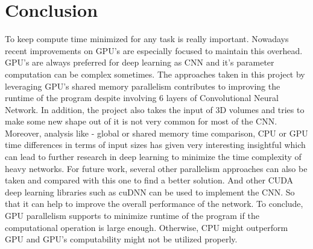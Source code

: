 \documentclass[11pt]{article}       %
\begin{document}
\section{Conclusion} \label{concl}
To keep compute time minimized for any task is really important. Nowadays recent improvements on GPU's are especially focused to maintain this overhead. GPU's are always preferred for deep learning as CNN and it's parameter computation can be complex sometimes. The approaches taken in this project by leveraging GPU's shared memory parallelism contributes to improving the runtime of the program despite involving 6 layers of Convolutional Neural Network. In addition, the project also takes the input of 3D volumes and tries to make some new shape out of it is not very common for most of the CNN. Moreover,  analysis like - global or shared memory time comparison, CPU or GPU time differences in terms of input sizes has given very interesting insightful which can lead to further research in deep learning to minimize the time complexity of heavy networks.\newline
For future work, several other parallelism approaches can also be taken and compared with this one to find a better solution. And other CUDA deep learning libraries such as cuDNN can be used to implement the CNN. So that it can help to improve the overall performance of the network. To conclude, GPU parallelism supports to minimize runtime of the program if the computational operation is large enough. Otherwise, CPU might outperform GPU and GPU's computability might not be utilized properly.




\end{document}
